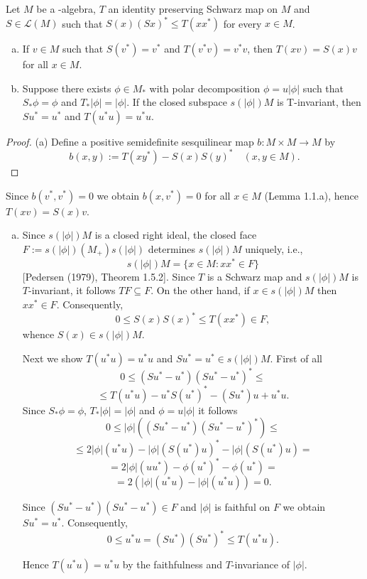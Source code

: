 \begin{lemma}\label{lem:1.2}
Let $M$ be a \WA-algebra, $T$ an identity preserving Schwarz map on $M$ and $S\in\mathcal{L}(M)$ such that $S(x)(Sx)^* \leq T(xx^*)$ for every $x\in M$.

\begin{enumerate}[(a)]
\item If $v\in M$ such that $S(v^*) = v^*$ and $T(v^*v) = v^*v$, then $T(xv) = S(x)v$ for all $x\in M$.
\item Suppose there exists $\phi\in M_{*}$ with polar decomposition $\phi = u|\phi|$ such that $S_{*}\phi = \phi$ and $T_{*}|\phi| = |\phi|$.
If the closed subspace $s(|\phi|)M$ is T-invariant, then $Su^* = u^*$ and $T(u^*u) = u^*u$.
\end{enumerate}
\end{lemma}
\begin{proof}
(a) Define a positive semidefinite sesquilinear map $b: M\times M \to M$ by
\[
b(x,y) := T(xy^*) - S(x)S(y)^* \quad (x,y\in M).
\]
\end{proof}


Since $b(v^{*},v^{*}) = 0$ we obtain $b(x,v^{*}) = 0$ for all $x \in M$ (Lemma 1.1.a), hence $T(xv) = S(x)v$.

\begin{enumerate}[(a)]
\item 
Since $s(|\phi|)M$ is a closed right ideal, the closed face $F := s(|\phi|)(M_{+})s(|\phi|)$ determines $s(|\phi|)M$ uniquely, i.e.,
\[
s(|\phi|)M = \{x \in M : xx^{*} \in F\}
\]
[Pedersen (1979), Theorem 1.5.2].
Since $T$ is a Schwarz map and $s(|\phi|)M$ is $T$-invariant, it follows $TF \subseteq F$.
On the other hand, if $x \in s(|\phi|)M$ then $xx^{*} \in F$.
Consequently,
\[
0 \leq S(x)S(x)^{*} \leq T(xx^{*}) \in F,
\]
whence $S(x) \in s(|\phi|)M$.

Next we show $T(u^{*}u) = u^{*}u$ and $Su^{*} = u^{*} \in s(|\phi|)M$.
First of all
\[
0 \leq (Su^{*} - u^{*})(Su^{*} - u^{*})^{*} \leq
\]
\[
\leq T(u^{*}u) - u^{*}S(u^{*})^{*} - (Su^{*})u + u^{*}u.
\]
Since $S_{*}\phi = \phi$, $T_{*}|\phi| = |\phi|$ and $\phi = u|\phi|$ it follows
\[
0 \leq |\phi|((Su^{*} - u^{*})(Su^{*} - u^{*})^{*}) \leq
\]
\[
\leq 2|\phi|(u^{*}u) - |\phi|(S(u^{*})u)^{*} - |\phi|(S(u^{*})u) =
\]
\[
= 2|\phi|(uu^{*}) - \phi(u^{*})^{*} - \phi(u^{*}) =
\]
\[
= 2(|\phi|(u^{*}u) - |\phi|(u^{*}u)) = 0.
\]

Since $(Su^{*} - u^{*})(Su^{*} - u^{*}) \in F$ and $|\phi|$ is faithful on $F$ we obtain $Su^{*} = u^{*}$.
Consequently,
\[
0 \leq u^{*}u = (Su^{*})(Su^{*})^{*} \leq T(u^{*}u).
\]

Hence $T(u^{*}u) = u^{*}u$ by the faithfulness and $T$-invariance of $|\phi|$.
\end{enumerate}

